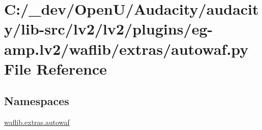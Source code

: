\hypertarget{lv2_2plugins_2eg-amp_8lv2_2waflib_2extras_2autowaf_8py}{}\section{C\+:/\+\_\+dev/\+Open\+U/\+Audacity/audacity/lib-\/src/lv2/lv2/plugins/eg-\/amp.lv2/waflib/extras/autowaf.py File Reference}
\label{lv2_2plugins_2eg-amp_8lv2_2waflib_2extras_2autowaf_8py}
\subsection*{Namespaces}
\begin{DoxyCompactItemize}
\item 
 \hyperlink{namespacewaflib_1_1extras_1_1autowaf}{waflib.\+extras.\+autowaf}
\end{DoxyCompactItemize}
